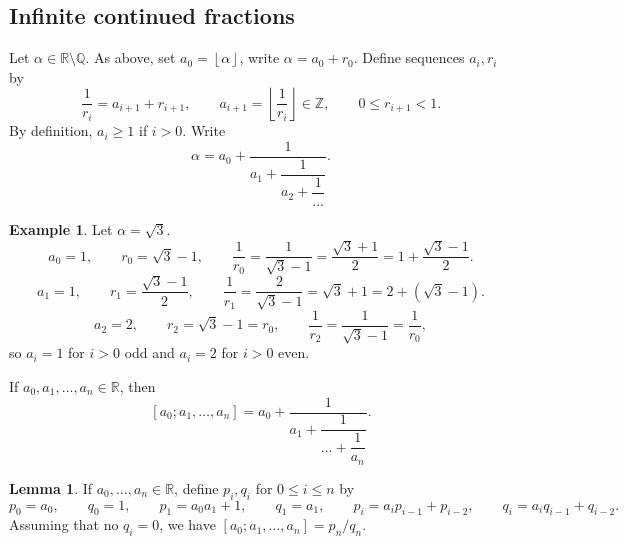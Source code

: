 \documentclass{article}
\newcommand{\Z}{\mathbb{Z}}
\newcommand{\Q}{\mathbb{Q}}
\newcommand{\R}{\mathbb{R}}
\newcommand{\rb}[1]{\left( #1 \right)}
\renewcommand{\sb}[1]{\left[ #1 \right]}
\newcommand{\fb}[1]{\left\lfloor #1 \right\rfloor}
\theoremstyle{definition}\newtheorem{definition}{Definition}
\theoremstyle{definition}\newtheorem{remark}[definition]{Remark}
\theoremstyle{definition}\newtheorem*{example}{Example}
\theoremstyle{definition}\newtheorem*{note}{Note}
\newtheorem{lemma}[definition]{Lemma}
\begin{document}
\subsection{Infinite continued fractions}

Let $ \alpha \in \R \setminus \Q $. As above, set $ a_0 = \fb{\alpha} $, write $ \alpha = a_0 + r_0 $. Define sequences $ a_i, r_i $ by
$$ \dfrac{1}{r_i} = a_{i + 1} + r_{i + 1}, \qquad a_{i + 1} = \fb{\dfrac{1}{r_i}} \in \Z, \qquad 0 \le r_{i + 1} < 1. $$
By definition, $ a_i \ge 1 $ if $ i > 0 $. Write
$$ \alpha = a_0 + \dfrac{1}{a_1 + \dfrac{1}{a_2 + \dfrac{1}{\dots}}}. $$

\begin{example}
Let $ \alpha = \sqrt{3} $.
$$ a_0 = 1, \qquad r_0 = \sqrt{3} - 1, \qquad \dfrac{1}{r_0} = \dfrac{1}{\sqrt{3} - 1} = \dfrac{\sqrt{3} + 1}{2} = 1 + \dfrac{\sqrt{3} - 1}{2}. $$
$$ a_1 = 1, \qquad r_1 = \dfrac{\sqrt{3} - 1}{2}, \qquad \dfrac{1}{r_1} = \dfrac{2}{\sqrt{3} - 1} = \sqrt{3} + 1 = 2 + \rb{\sqrt{3} - 1}. $$
$$ a_2 = 2, \qquad r_2 = \sqrt{3} - 1 = r_0, \qquad \dfrac{1}{r_2} = \dfrac{1}{\sqrt{3} - 1} = \dfrac{1}{r_0}, $$
so $ a_i = 1 $ for $ i > 0 $ odd and $ a_i = 2 $ for $ i > 0 $ even.
\end{example}

If $ a_0, a_1, \dots, a_n \in \R $, then
$$ \sb{a_0; a_1, \dots, a_n} = a_0 + \dfrac{1}{a_1 + \dfrac{1}{\dots + \dfrac{1}{a_n}}}. $$

\begin{lemma}
\label{lem:68}
If $ a_0, \dots, a_n \in \R $, define $ p_i, q_i $ for $ 0 \le i \le n $ by
$$ p_0 = a_0, \qquad q_0 = 1, \qquad p_1 = a_0a_1 + 1, \qquad q_1 = a_1, \qquad p_i = a_ip_{i - 1} + p_{i - 2}, \qquad q_i = a_iq_{i - 1} + q_{i - 2}. $$
Assuming that no $ q_i = 0 $, we have $ \sb{a_0; a_1, \dots, a_n} = p_n / q_n $.
\end{lemma}
\end{document}
